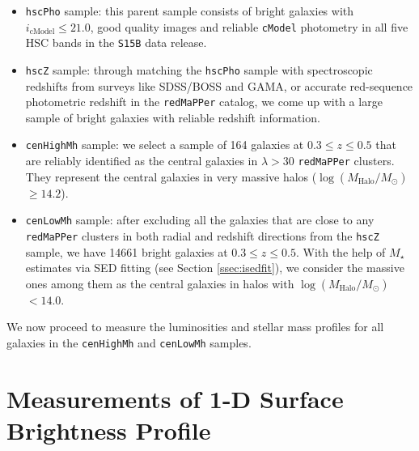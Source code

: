\documentclass{emulateapj}
\def\redm{\texttt{redMaPPer}}
\def\rbcg{\texttt{cenHighMh}}
\def\nbcg{\texttt{cenLowMh}}
\def\mstar{{$M_{\star}$}}
\def\logmh{{$\log (M_{\mathrm{Halo}}/M_{\odot})$}}
\begin{document}
\begin{CJK*}{UTF8}{gbsn}
    \begin{itemize}
        \item \texttt{hscPho} sample: this parent sample consists of bright galaxies 
            with $i_{\mathrm{cModel}} \leq 21.0$, good quality images and reliable 
            \texttt{cModel} photometry in all five HSC bands in the \texttt{S15B} 
            data release. 
        \item \texttt{hscZ} sample: through matching the \texttt{hscPho} sample with 
            spectroscopic redshifts from surveys like SDSS/BOSS and GAMA, or accurate 
            red-sequence photometric redshift in the \redm{} catalog, we come up with 
            a large sample of bright galaxies with reliable redshift information. 
        \item \rbcg{} sample: we select a sample of 164 galaxies at 
            $0.3 \leq z \leq 0.5$ that are reliably identified as the central galaxies 
            in $\lambda > 30$ \redm{} clusters. 
            They represent the central galaxies in very massive halos 
            (\logmh{}$\geq 14.2$). 
        \item \nbcg{} sample: after excluding all the galaxies that are close to any 
            \redm{} clusters in both radial and redshift directions from the 
            \texttt{hscZ} sample, we have 14661 bright galaxies at 
            $0.3 \leq z \leq 0.5$.
            With the help of \mstar{} estimates via SED fitting (see Section 
            \ref{ssec:isedfit}), we consider the massive ones among them as the 
            central galaxies in halos with \logmh{}$<14.0$.  
    \end{itemize}
    
    We now proceed to measure the luminosities and stellar mass profiles for 
    all galaxies in the \rbcg{} and \nbcg{} samples.

\section{Measurements of 1-D Surface Brightness Profile}
    \label{sec:ellipse}
    

\end{CJK*}
\end{document}
